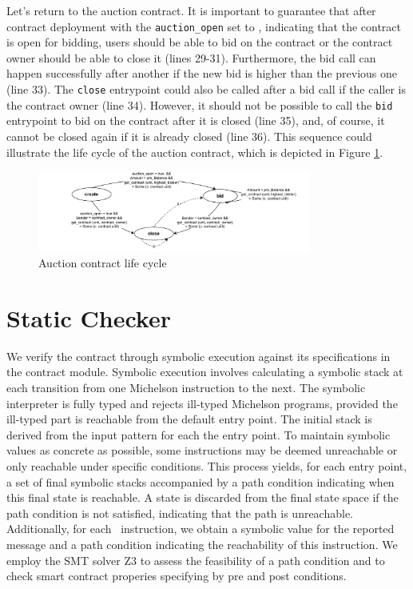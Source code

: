 \documentclass[a4paper,UKenglish,cleveref, autoref, thm-restate]{lipics-v2021}
\begin{document}
Let's return to the auction contract. It is important to guarantee that after contract deployment with the  \lstinline/auction_open/ set to \TRUE, indicating that the contract is open for bidding, users should be able to bid on the contract or the contract owner should be able to close it (lines 29-31). Furthermore, the bid call can happen successfully after another if the new bid is higher than the previous one (line 33). The  \lstinline/close/ entrypoint could also be called after a bid call if the caller is the contract owner (line 34). However, it should not be possible to call the  \lstinline/bid/ entrypoint to bid on the contract after it is closed (line 35), and, of course, it cannot be closed again if it is already closed (line 36). This sequence could illustrate the life cycle of the auction contract, which is depicted in Figure \ref{fig:auction-life-cycle}.

\begin{figure}[h]
    \centering
    \includegraphics[width=0.8\textwidth]{auction-life-cycle}
    \caption{Auction contract life cycle}
    \label{fig:auction-life-cycle}
\end{figure}

\section {Static Checker}
We verify the contract through symbolic execution against its specifications in the contract module. Symbolic execution involves calculating a symbolic stack at each transition from one Michelson instruction to the next. The symbolic interpreter is fully typed and rejects ill-typed Michelson programs, provided the ill-typed part is reachable from the default entry point. The initial stack is derived from the input pattern for each the entry point. To maintain symbolic values as concrete as possible, some instructions may be deemed unreachable or only reachable under specific conditions. This process yields, for each entry point, a set of final symbolic stacks accompanied by a path condition indicating when this final state is reachable. A state is discarded from the final state space if the path condition is not satisfied, indicating that the path is unreachable. Additionally, for each \FAILWITH\ instruction, we obtain a symbolic value for the reported message and a path condition indicating the reachability of this instruction. We employ the SMT solver Z3  to assess the feasibility of a path condition and to check smart contract properies specifying by pre and post conditions. 
\end{document}
